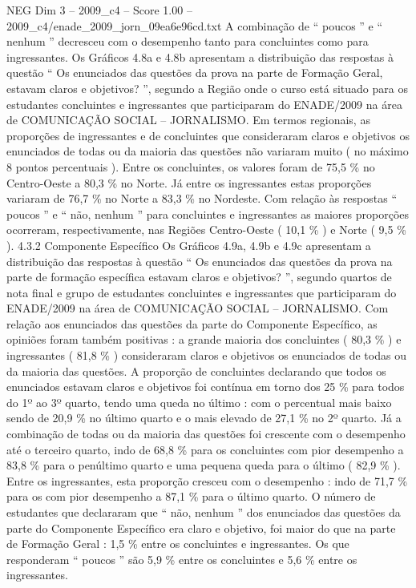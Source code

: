 \begin{textsample}{NEG Dim 3 – 2009\_c4 – Score 1.00 – 2009\_c4/enade\_2009\_jorn\_09ea6e96cd.txt}
A combinação de “ poucos ” e “ nenhum ” decresceu com o desempenho tanto para concluintes como para ingressantes.
Os Gráficos 4.8a e 4.8b apresentam a distribuição das respostas à questão “ Os enunciados das questões da prova na parte de Formação Geral, estavam claros e objetivos? ”, segundo a Região onde o curso está situado para os estudantes concluintes e ingressantes que participaram do ENADE/2009 na área de COMUNICAÇÃO SOCIAL – JORNALISMO.
Em termos regionais, as proporções de ingressantes e de concluintes que consideraram claros e objetivos os enunciados de todas ou da maioria das questões não variaram muito ( no máximo 8 pontos percentuais ).
Entre os concluintes, os valores foram de 75,5 \% no Centro-Oeste a 80,3 \% no Norte.
Já entre os ingressantes estas proporções variaram de 76,7 \% no Norte a 83,3 \% no Nordeste.
Com relação às respostas “ poucos ” e “ não, nenhum ” para concluintes e ingressantes as maiores proporções ocorreram, respectivamente, nas Regiões Centro-Oeste ( 10,1 \% ) e Norte ( 9,5 \% ). 4.3.2 Componente Específico Os Gráficos 4.9a, 4.9b e 4.9c apresentam a distribuição das respostas à questão “ Os enunciados das questões da prova na parte de formação específica estavam claros e objetivos? ”, segundo quartos de nota final e grupo de estudantes concluintes e ingressantes que participaram do ENADE/2009 na área de COMUNICAÇÃO SOCIAL – JORNALISMO.
Com relação aos enunciados das questões da parte do Componente Específico, as opiniões foram também positivas : a grande maioria dos concluintes ( 80,3 \% ) e ingressantes ( 81,8 \% ) consideraram claros e objetivos os enunciados de todas ou da maioria das questões.
A proporção de concluintes declarando que todos os enunciados estavam claros e objetivos foi contínua em torno dos 25 \% para todos do 1º ao 3º quarto, tendo uma queda no último : com o percentual mais baixo sendo de 20,9 \% no último quarto e o mais elevado de 27,1 \% no 2º quarto.
Já a combinação de todas ou da maioria das questões foi crescente com o desempenho até o terceiro quarto, indo de 68,8 \% para os concluintes com pior desempenho a 83,8 \% para o penúltimo quarto e uma pequena queda para o último ( 82,9 \% ).
Entre os ingressantes, esta proporção cresceu com o desempenho : indo de 71,7 \% para os com pior desempenho a 87,1 \% para o último quarto.
O número de estudantes que declararam que “ não, nenhum ” dos enunciados das questões da parte do Componente Específico era claro e objetivo, foi maior do que na parte de Formação Geral : 1,5 \% entre os concluintes e ingressantes.
Os que responderam “ poucos ” são 5,9 \% entre os concluintes e 5,6 \% entre os ingressantes.

\end{textsample}
